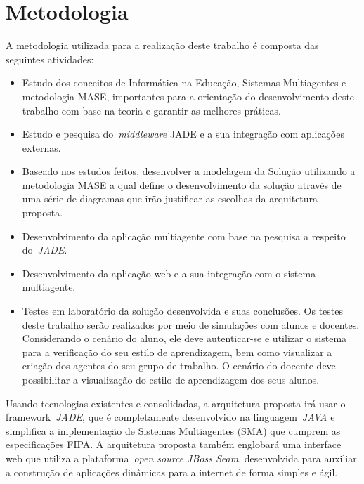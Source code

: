 \section{Metodologia}
A metodologia utilizada para a realização deste trabalho é composta das seguintes atividades:
\begin{itemize}
 	\item Estudo dos conceitos de Informática na Educação, Sistemas Multiagentes e metodologia MASE, importantes para a orientação do desenvolvimento deste trabalho com base na teoria e garantir as melhores práticas.
	\item Estudo e pesquisa do~\emph{middleware} JADE e a sua integração com aplicações externas.
	\item Baseado nos estudos feitos, desenvolver a modelagem da Solução utilizando a metodologia MASE a qual define o desenvolvimento da solução através de uma série de diagramas que irão justificar as escolhas da arquitetura proposta.
	\item Desenvolvimento da aplicação multiagente com base na pesquisa a respeito do~\emph{JADE}.
	\item Desenvolvimento da aplicação web e a sua integração com o sistema multiagente.
	\item Testes em laboratório da solução desenvolvida e suas conclusões. Os testes deste trabalho serão realizados por meio de simulações com alunos e docentes. Considerando o cenário do aluno, ele deve autenticar-se e utilizar o sistema para a verificação do seu estilo de aprendizagem, bem como visualizar a criação dos agentes do seu grupo de trabalho. O cenário do docente deve possibilitar a visualização do estilo de aprendizagem dos seus alunos.
\end{itemize}

Usando tecnologias existentes e consolidadas, a arquitetura proposta irá usar o framework~\emph{JADE}, que é completamente desenvolvido na linguagem~\emph{JAVA} e simplifica a implementação de Sistemas Multiagentes (SMA) que cumprem as especificações FIPA. A arquitetura proposta também englobará uma interface web que utiliza a plataforma~\emph{open source JBoss Seam}, desenvolvida para auxiliar a construção de aplicações dinâmicas para a internet de forma simples e ágil.

